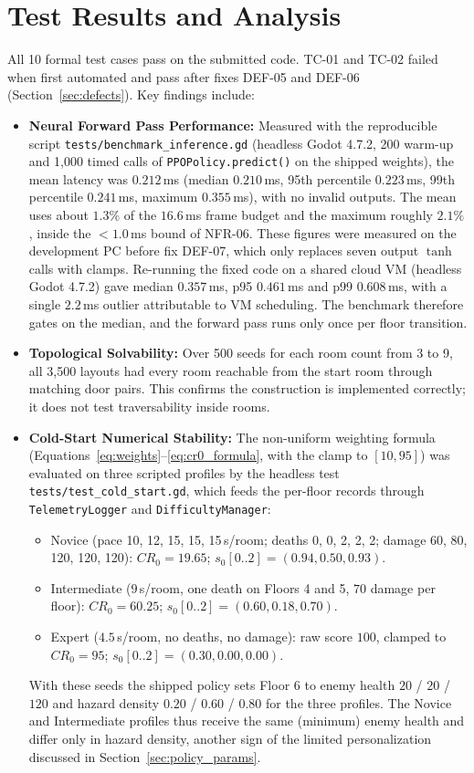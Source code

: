 \section{Test Results and Analysis}
All 10 formal test cases pass on the submitted code. TC-01 and TC-02 failed when first automated and pass after fixes DEF-05 and DEF-06 (Section~\ref{sec:defects}). Key findings include:
\begin{itemize}
    \item \textbf{Neural Forward Pass Performance:} Measured with the reproducible script \texttt{tests/benchmark\_inference.gd} (headless Godot 4.7.2, 200 warm-up and 1,000 timed calls of \texttt{PPOPolicy.predict()} on the shipped weights), the mean latency was $0.212$\,ms (median $0.210$\,ms, 95th percentile $0.223$\,ms, 99th percentile $0.241$\,ms, maximum $0.355$\,ms), with no invalid outputs. The mean uses about $1.3\%$ of the $16.6$\,ms frame budget and the maximum roughly $2.1\%$, inside the $<1.0$\,ms bound of NFR-06. These figures were measured on the development PC before fix DEF-07, which only replaces seven output $\tanh$ calls with clamps. Re-running the fixed code on a shared cloud VM (headless Godot 4.7.2) gave median $0.357$\,ms, p95 $0.461$\,ms and p99 $0.608$\,ms, with a single $2.2$\,ms outlier attributable to VM scheduling. The benchmark therefore gates on the median, and the forward pass runs only once per floor transition.
    \item \textbf{Topological Solvability:} Over 500 seeds for each room count from 3 to 9, all 3,500 layouts had every room reachable from the start room through matching door pairs. This confirms the construction is implemented correctly; it does not test traversability inside rooms.
    \item \textbf{Cold-Start Numerical Stability:} The non-uniform weighting formula (Equations~\ref{eq:weights}--\ref{eq:cr0_formula}, with the clamp to $[10, 95]$) was evaluated on three scripted profiles by the headless test \texttt{tests/test\_cold\_start.gd}, which feeds the per-floor records through \texttt{TelemetryLogger} and \texttt{DifficultyManager}:
    \begin{itemize}
        \item Novice (pace 10, 12, 15, 15, 15\,s/room; deaths 0, 0, 2, 2, 2; damage 60, 80, 120, 120, 120): $CR_0 = 19.65$; $s_0[0..2] = (0.94, 0.50, 0.93)$.
        \item Intermediate ($9$\,s/room, one death on Floors 4 and 5, $70$ damage per floor): $CR_0 = 60.25$; $s_0[0..2] = (0.60, 0.18, 0.70)$.
        \item Expert ($4.5$\,s/room, no deaths, no damage): raw score $100$, clamped to $CR_0 = 95$; $s_0[0..2] = (0.30, 0.00, 0.00)$.
    \end{itemize}
    With these seeds the shipped policy sets Floor 6 to enemy health $20$ / $20$ / $120$ and hazard density $0.20$ / $0.60$ / $0.80$ for the three profiles. The Novice and Intermediate profiles thus receive the same (minimum) enemy health and differ only in hazard density, another sign of the limited personalization discussed in Section~\ref{sec:policy_params}.
\end{itemize}


